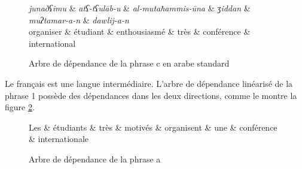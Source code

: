 {    
\begin{figure}[H]
     \caption{Arbre de dépendance de la phrase c en arabe standard}
    \label{fig:motives-arabe}
  \begin{dependency}[font=\footnotesize,arc edge, arc angle=80, text only label, label style={above}]
    \begin{deptext}
    \textit{junaðʕimu} \& \textit{atʕ-tʕul\=ab-u} \& \textit{al-mutaħammis-\=una} \& \textit{ʒiddan} \& \textit{muʔtamar-a-n} \& \textit{dawlij-a-n}\\
   organiser  \& étudiant \& enthousiasmé \& très \& conférence \& international\\
    \end{deptext}
    \end{dependency}
\end{figure}

    Le français est une langue intermédiaire. L’arbre de dépendance linéarisé de la phrase 1 possède des dépendances dans les deux directions, comme le montre la  figure \ref{fig:motives-francais}.
    
    \begin{figure}[H]
    \caption{Arbre de dépendance de la phrase a}
    \begin{dependency}[font=\normalfont\itshape,arc edge, arc angle=80, text only label, label style={above}]
    \begin{deptext}
    Les \& étudiants \& très \& motivés \& organisent \& une \& conférence \& internationale\\
    \end{deptext}
    \end{dependency}    
\label{fig:motives-francais}
\end{figure}
}
